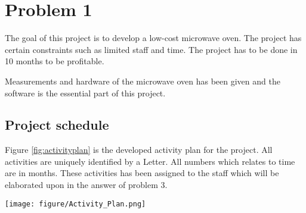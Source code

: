 \chapter{Problem 1}
\label{chp:intro}

The goal of this project is to develop a low-cost microwave oven. 
The project has certain constraints such as limited staff and time. The project has to be done in 10 months to be profitable. 

Measurements and hardware of the microwave oven has been given and the software is the essential part of this project.

\section{Project schedule}
Figure \ref{fig:activityplan} is the developed activity plan for the project. All activities are uniquely identified by a Letter. All numbers which relates to time are in months. These activities has been assigned to the staff which will be elaborated upon in the answer of problem 3. 
\begin{sidewaysfigure}
	\centering 
	\texttt{[image: figure/Activity\_Plan.png]} 
	\caption{Activity Plan} 
	\label{fig:activityplan}
\end{sidewaysfigure}

